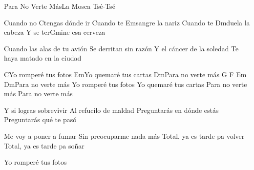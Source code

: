 \begin{musica}{Para No Verte Más}{La Mosca Tsé-Tsé}{}

Cuando no \ac{C}{ten}gas dónde ir
Cuando te \ac{Em}{san}gre la nariz
Cuando te \ac{Dm}{due}la la cabeza
Y se ter\ac{G}{mi}ne esa cerveza

Cuando las alas de tu avión
Se derritan sin razón
Y el cáncer de la soledad
Te haya matado en la ciudad

\ac{C}{}Yo romperé tus fotos
\ac{Em}{}Yo quemaré tus cartas
\ac{Dm}{}Para no verte más
\ac{G F Em Dm}{}Para no verte más
Yo romperé tus fotos
Yo quemaré tus cartas
Para no verte más
Para no verte más


Y si logras sobrevivir
Al refucilo de maldad
Preguntarás en dónde estás
Preguntarás qué te pasó

Me voy a poner a fumar
Sin preocuparme nada más
Total, ya es tarde pa volver
Total, ya es tarde pa soñar




Yo romperé tus fotos

\end{musica}
